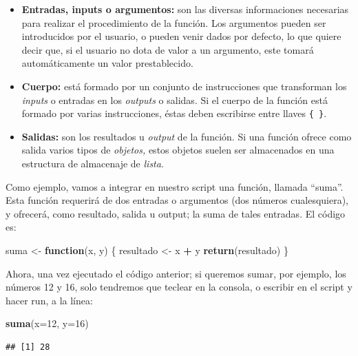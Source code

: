 \documentclass[
]{book}
\newenvironment{Shaded}{\begin{snugshade}}{\end{snugshade}}
\newcommand{\AttributeTok}[1]{\textcolor[rgb]{0.13,0.29,0.53}{#1}}
\newcommand{\ControlFlowTok}[1]{\textcolor[rgb]{0.13,0.29,0.53}{\textbf{#1}}}
\newcommand{\DecValTok}[1]{\textcolor[rgb]{0.00,0.00,0.81}{#1}}
\newcommand{\FunctionTok}[1]{\textcolor[rgb]{0.13,0.29,0.53}{\textbf{#1}}}
\newcommand{\NormalTok}[1]{#1}
\newcommand{\OtherTok}[1]{\textcolor[rgb]{0.56,0.35,0.01}{#1}}
\newcommand{\SpecialCharTok}[1]{\textcolor[rgb]{0.81,0.36,0.00}{\textbf{#1}}}
\begin{document}
\begin{itemize}
\item
  \textbf{Entradas, inputs o argumentos:} son las diversas informaciones necesarias para realizar el procedimiento de la función. Los argumentos pueden ser introducidos por el usuario, o pueden venir dados por defecto, lo que quiere decir que, si el usuario no dota de valor a un argumento, este tomará automáticamente un valor prestablecido.
\item
  \textbf{Cuerpo:} está formado por un conjunto de instrucciones que transforman los \emph{inputs} o entradas en los \emph{outputs} o salidas. Si el cuerpo de la función está formado por varias instrucciones, éstas deben escribirse entre llaves \texttt{\{\ \}}.
\item
  \textbf{Salidas:} son los resultados u \emph{output} de la función. Si una función ofrece como salida varios tipos de \emph{objetos,} estos objetos suelen ser almacenados en una estructura de almacenaje de \emph{lista}.
\end{itemize}

Como ejemplo, vamos a integrar en nuestro script una función, llamada ``suma''. Esta función requerirá de dos entradas o argumentos (dos números cualesquiera), y ofrecerá, como resultado, salida u output; la suma de tales entradas. El código es:

\begin{Shaded}
\begin{Highlighting}[]
\NormalTok{suma }\OtherTok{\textless{}{-}} \ControlFlowTok{function}\NormalTok{(x, y) \{}
\NormalTok{  resultado }\OtherTok{\textless{}{-}}\NormalTok{ x }\SpecialCharTok{+}\NormalTok{ y}
  \FunctionTok{return}\NormalTok{(resultado)}
\NormalTok{\}}
\end{Highlighting}
\end{Shaded}

Ahora, una vez ejecutado el código anterior; si queremos sumar, por ejemplo, los números 12 y 16, solo tendremos que teclear en la consola, o escribir en el script y hacer run, a la línea:

\begin{Shaded}
\begin{Highlighting}[]
\FunctionTok{suma}\NormalTok{(}\AttributeTok{x=}\DecValTok{12}\NormalTok{, }\AttributeTok{y=}\DecValTok{16}\NormalTok{)}
\end{Highlighting}
\end{Shaded}

\begin{verbatim}
## [1] 28
\end{verbatim}
\end{document}
